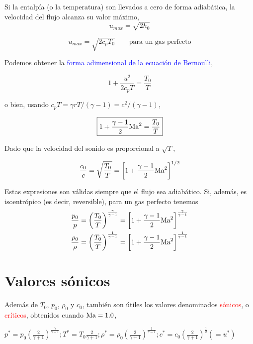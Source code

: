 	Si la entalpía (o la temperatura) son llevados a cero de forma adiabática,
	la velocidad del flujo alcanza su valor máximo, 
	\[
	u_{max}=\sqrt{2h_{0}}
	\]
	
	\[
	u_{max}=\sqrt{2c_{p}T_{0}}\qquad\text{para un gas perfecto}
	\]
	
	Podemos obtener la \textcolor{blue}{forma adimensional de la ecuación
		de Bernoulli}, 
	
\begin{equation}
		1+\frac{u^{2}}{2c_{p}T}=\frac{T_{0}}{T}
\end{equation}
	
	o bien, usando $c_{p}T=\gamma rT/(\gamma-1)=c^{2}/(\gamma-1)$, 
	
\begin{equation}
		\boxed{1+\frac{\gamma-1}{2}\text{Ma}^{2}=\frac{T_{0}}{T}}
\end{equation}
		
	Dado que la velocidad del sonido es proporcional a $\sqrt{T}$, 
	
\begin{equation}
		\frac{c_{0}}{c}=\sqrt{\frac{T_{0}}{T}}=\left[1+\frac{\gamma-1}{2}\text{Ma}^{2}\right]^{1/2}
\end{equation}
	
	
	Estas expresiones son válidas siempre que el flujo sea adiabático.
	Si, además, es isoentrópico (es decir, reversible), para un gas perfecto
	tenemos 
	\begin{eqnarray}
		\frac{p_{0}}{p}=\left(\frac{T_{0}}{T}\right)^{\frac{\gamma}{\gamma-1}}=\left[1+\frac{\gamma-1}{2}\text{Ma}^{2}\right]^{\frac{\gamma}{\gamma-1}}\\
		\frac{\rho_{0}}{\rho}=\left(\frac{T_{0}}{T}\right)^{\frac{1}{\gamma-1}}=\left[1+\frac{\gamma-1}{2}\text{Ma}^{2}\right]^{\frac{1}{\gamma-1}}
	\end{eqnarray}
	


\section{Valores sónicos}
	
	Además de $T_{0}$, $p_{0}$, $\rho_{0}$ y $c_{0}$, también son
	útiles los valores denominados \textcolor{red}{sónicos}, o \textcolor{red}{críticos}, obtenidos cuando $\text{Ma}=1.0$,
	
	 $p^{*}=p_{0}\left(\frac{2}{\gamma+1}\right)^{\frac{\gamma}{\gamma-1}};T^{*}=T_{0}\frac{2}{\gamma+1};\rho^{*}=\rho_{0}\left(\frac{2}{\gamma+1}\right)^{\frac{1}{\gamma-1}};c^{*}=c_{0}\left(\frac{2}{\gamma+1}\right)^{\frac{1}{2}}(=u^{*})$



